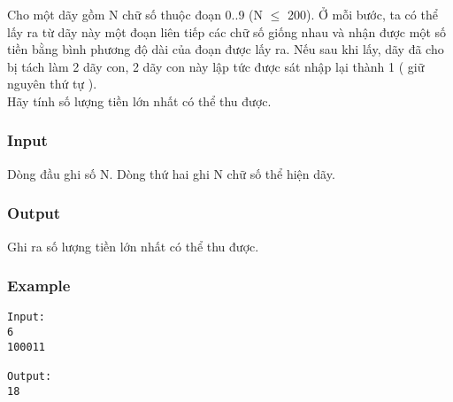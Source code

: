 



   Cho một dãy gồm N chữ số thuộc đoạn 0..9 (N $\le$ 200). Ở mỗi bước, ta có thể lấy ra từ dãy này một đoạn liên tiếp các chữ số giống nhau và nhận được một số tiền bằng bình phương độ dài của đoạn được lấy ra. Nếu sau khi lấy, dãy đã cho bị tách làm 2 dãy con, 2 dãy con này lập tức được sát nhập lại thành 1 ( giữ nguyên thứ tự ).   
\\   Hãy tính số lượng tiền lớn nhất có thể thu được.  

\subsubsection{   Input  }

   Dòng đầu ghi số N. Dòng thứ hai ghi N chữ số thể hiện dãy.  

\subsubsection{   Output  }

   Ghi ra số lượng tiền lớn nhất có thể thu được.  

\subsubsection{   Example  }
\begin{verbatim}
Input:
6
100011

Output:
18
\end{verbatim}
